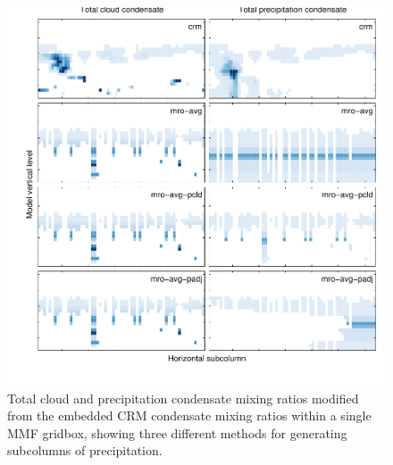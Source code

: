 \documentclass[letter]{article}
\begin{document}
\begin{figure}
\centering
\includegraphics{test_subgrid_mro.pdf}
\caption{Total cloud and precipitation condensate mixing ratios modified from the embedded CRM condensate mixing ratios within a single MMF gridbox, showing three different methods for generating subcolumns of precipitation.}
\label{subgrid_fields_mro}
\end{figure}
\end{document}
